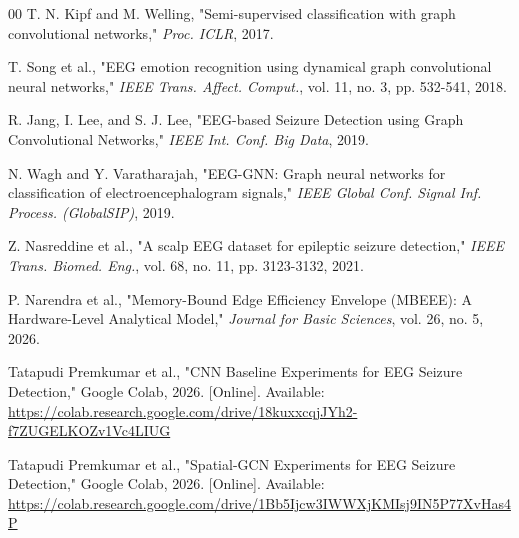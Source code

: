 \documentclass[journal]{IEEEtran}
\begin{document}
\begin{thebibliography}{00}
 T. N. Kipf and M. Welling, "Semi-supervised classification with graph convolutional networks," \textit{Proc. ICLR}, 2017.

 T. Song et al., "EEG emotion recognition using dynamical graph convolutional neural networks," \textit{IEEE Trans. Affect. Comput.}, vol. 11, no. 3, pp. 532-541, 2018.

 R. Jang, I. Lee, and S. J. Lee, "EEG-based Seizure Detection using Graph Convolutional Networks," \textit{IEEE Int. Conf. Big Data}, 2019.


 N. Wagh and Y. Varatharajah, "EEG-GNN: Graph neural networks for classification of electroencephalogram signals," \textit{IEEE Global Conf. Signal Inf. Process. (GlobalSIP)}, 2019.

 Z. Nasreddine et al., "A scalp EEG dataset for epileptic seizure detection," \textit{IEEE Trans. Biomed. Eng.}, vol. 68, no. 11, pp. 3123-3132, 2021.

 P. Narendra et al., "Memory-Bound Edge Efficiency Envelope (MBEEE): A Hardware-Level Analytical Model," \textit{Journal for Basic Sciences}, vol. 26, no. 5, 2026.

 Tatapudi Premkumar et al., "CNN Baseline Experiments for EEG Seizure Detection," Google Colab, 2026. [Online]. Available: \url{https://colab.research.google.com/drive/18kuxxcqjJYh2-f7ZUGELKOZv1Vc4LIUG}

 Tatapudi Premkumar et al., "Spatial-GCN Experiments for EEG Seizure Detection," Google Colab, 2026. [Online]. Available: \url{https://colab.research.google.com/drive/1Bb5Ijcw3IWWXjKMIsj9IN5P77XvHas4P}


\end{thebibliography}
\end{document}
